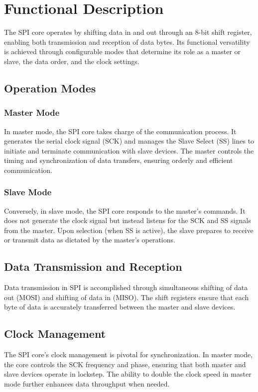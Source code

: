 \documentclass{article}
\begin{document}
\section{Functional Description}
The SPI core operates by shifting data in and out through an 8-bit shift register, enabling both transmission and reception of data bytes. Its functional versatility is achieved through configurable modes that determine its role as a master or slave, the data order, and the clock settings.

\subsection{Operation Modes}
\subsubsection{Master Mode}
In master mode, the SPI core takes charge of the communication process. It generates the serial clock signal (SCK) and manages the Slave Select (SS) lines to initiate and terminate communication with slave devices. The master controls the timing and synchronization of data transfers, ensuring orderly and efficient communication.

\subsubsection{Slave Mode}
Conversely, in slave mode, the SPI core responds to the master's commands. It does not generate the clock signal but instead listens for the SCK and SS signals from the master. Upon selection (when SS is active), the slave prepares to receive or transmit data as dictated by the master's operations.

\subsection{Data Transmission and Reception}
Data transmission in SPI is accomplished through simultaneous shifting of data out (MOSI) and shifting of data in (MISO). The shift registers ensure that each byte of data is accurately transferred between the master and slave devices.

\subsection{Clock Management}
The SPI core's clock management is pivotal for synchronization. In master mode, the core controls the SCK frequency and phase, ensuring that both master and slave devices operate in lockstep. The ability to double the clock speed in master mode further enhances data throughput when needed.
\end{document}
